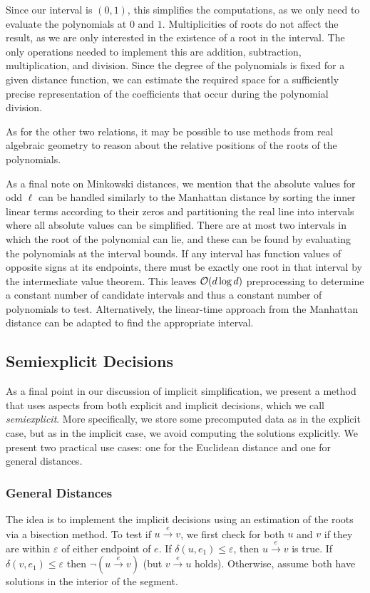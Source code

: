 Since our interval is \((0, 1)\), this simplifies the computations, as we only need to evaluate the polynomials at \(0\) and \(1\). Multiplicities of roots do not affect the result, as we are only interested in the existence of a root in the interval.
The only operations needed to implement this are addition, subtraction, multiplication, and division. Since the degree of the polynomials is fixed for a given distance function, we can estimate the required space for a sufficiently precise representation of the coefficients that occur during the polynomial division.

As for the other two relations, it may be possible to use methods from real algebraic geometry to reason about the relative positions of the roots of the polynomials.

As a final note on Minkowski distances, we mention that the absolute values for odd \(\ell\) can be handled similarly to the Manhattan distance by sorting the inner linear terms according to their zeros and partitioning the real line into intervals where all absolute values can be simplified. There are at most two intervals in which the root of the polynomial can lie, and these can be found by evaluating the polynomials at the interval bounds. If any interval has function values of opposite signs at its endpoints, there must be exactly one root in that interval by the intermediate value theorem. This leaves \(\mathcal{O}(d\log d)\) preprocessing to determine a constant number of candidate intervals and thus a constant number of polynomials to test. Alternatively, the linear-time approach from the Manhattan distance can be adapted to find the appropriate interval.

\subsection{Semiexplicit Decisions}
As a final point in our discussion of implicit simplification, we present a method that uses aspects from both explicit and implicit decisions, which we call \emph{semiexplicit}. More specifically, we store some precomputed data as in the explicit case, but as in the implicit case, we avoid computing the solutions explicitly. We present two practical use cases: one for the Euclidean distance and one for general distances.

\subsubsection{General Distances}
The idea is to implement the implicit decisions using an estimation of the roots via a bisection method. To test if \(u \overset e\rightarrow v\), we first check for both \(u\) and \(v\) if they are within \(\varepsilon\) of either endpoint of \(e\). If \(\delta(u, e_1) \leq \varepsilon\), then \(u \overset e\rightarrow v\) is true. If \(\delta(v, e_1) \leq \varepsilon\) then \(\lnot(u \overset e\rightarrow v)\) (but \(v \overset e\rightarrow u\) holds). Otherwise, assume both have solutions in the interior of the segment. 

